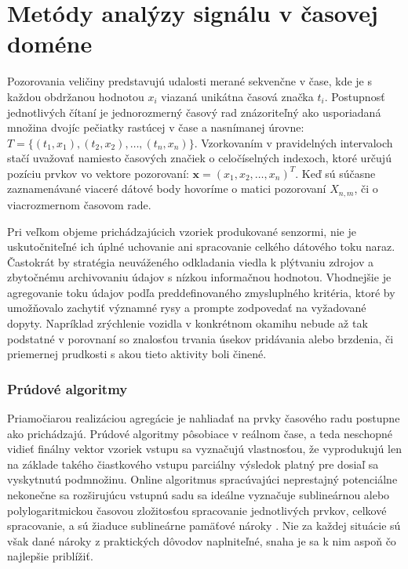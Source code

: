 \section{Metódy analýzy signálu v časovej doméne}
Pozorovania veličiny predstavujú udalosti merané sekvenčne v čase, kde je s každou obdržanou hodnotou $x_i$ viazaná unikátna 
časová značka $t_i$. Postupnosť jednotlivých čítaní je jednorozmerný časový rad znázoriteľný ako usporiadaná množina dvojíc pečiatky 
rastúcej v čase a nasnímanej úrovne: $T = \{(t_1, x_1),(t_2, x_2), …, (t_n, x_n)\}$. Vzorkovaním v pravidelných intervaloch stačí 
uvažovať namiesto časových značiek o celočíselných indexoch, ktoré určujú pozíciu prvkov vo vektore pozorovaní: 
$\mathbf{x} = (x_1, x_2, …, x_n)^T$. 
Keď sú súčasne zaznamenávané viaceré dátové body hovoríme o matici pozorovaní $X_{n,m}$, či o viacrozmernom časovom rade.

Pri veľkom objeme prichádzajúcich vzoriek produkované senzormi, nie je uskutočniteľné ich úplné uchovanie ani spracovanie celkého 
dátového toku naraz. Častokrát by stratégia neuváženého odkladania viedla k plýtvaniu zdrojov a zbytočnému archivovaniu údajov s nízkou 
informačnou hodnotou. Vhodnejšie je agregovanie toku údajov podľa preddefinovaného zmysluplného kritéria, ktoré by umožňovalo zachytiť 
významné rysy a prompte zodpovedať na vyžadované dopyty. Napríklad zrýchlenie vozidla v konkrétnom okamihu nebude až tak podstatné v 
porovnaní so znalosťou trvania úsekov pridávania alebo brzdenia, či priemernej prudkosti s akou tieto aktivity boli činené. 

\subsubsection{Prúdové algoritmy}
Priamočiarou realizáciou agregácie je nahliadať na prvky časového radu postupne ako prichádzajú. 
Prúdové algoritmy pôsobiace v reálnom čase, a teda neschopné vidieť finálny vektor vzoriek vstupu sa vyznačujú vlastnosťou, že 
vyprodukujú len na základe takého čiastkového vstupu parciálny výsledok platný pre dosiaľ sa vyskytnutú podmnožinu. Online algoritmus 
spracúvajúci neprestajný potenciálne nekonečne sa rozširujúcu vstupnú sadu sa ideálne vyznačuje sublineárnou alebo polylogaritmickou 
časovou zložitosťou spracovanie jednotlivých prvkov, celkové spracovanie, a sú žiaduce sublineárne pamäťové nároky \cite{data-streams}. 
Nie za každej situácie sú však dané nároky z praktických dôvodov naplniteľné, snaha je sa k nim aspoň čo najlepšie priblížiť. 

